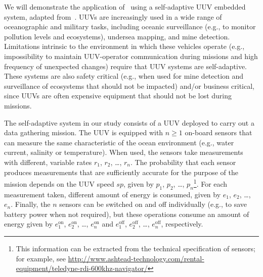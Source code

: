 
We will demonstrate the application of \approach\ using a self-adaptive UUV embedded system, adapted from~\cite{Gerasimou2014:SEAMS}. UUVs are increasingly used in a wide range of oceanographic and military tasks, including oceanic surveillance (e.g., to monitor pollution levels and ecosystems), undersea mapping, and mine detection. Limitations intrinsic to the environment in which these vehicles operate (e.g., impossibility  to maintain UUV-operator communication during missions and high frequency of unexpected changes) require that UUV systems are self-adaptive. These systems are also safety critical (e.g., when used for mine detection and surveillance of ecosystems that should not be impacted) and/or business critical, since UUVs are often expensive equipment that should not be lost during missions.

The self-adaptive system in our study consists of a UUV deployed to carry out a data gathering mission. The UUV is equipped with $n \geq 1$ on-board sensors that can measure the same characteristic of the ocean environment (e.g., water current, salinity or temperature). When used, the sensors take measurements with different, variable rates $r_1$, $r_2$, \ldots, $r_n$. The probability that each sensor produces measurements that are sufficiently accurate for the purpose of the mission depends on the UUV speed $sp$, given by  $p_1$, $p_2$, \ldots, $p_n$\footnote{This information can be extracted from the technical specification of sensors; for example, see \url{http://www.ashtead-technology.com/rental-equipment/teledyne-rdi-600khz-navigator/}}. For each measurement taken, different amount of energy is consumed, given by $e_1$, $e_2$, \ldots, $e_n$. %
Finally, the $n$ sensors can be switched on and off individually (e.g., to save battery power when not required), but these operations consume an amount of energy given by $e^\mathrm{on}_1$, $e^\mathrm{on}_2$, \ldots, $e^\mathrm{on}_n$ and $e^\mathrm{off}_1$, $e^\mathrm{off}_2$, \ldots, $e^\mathrm{off}_n$, respectively.

